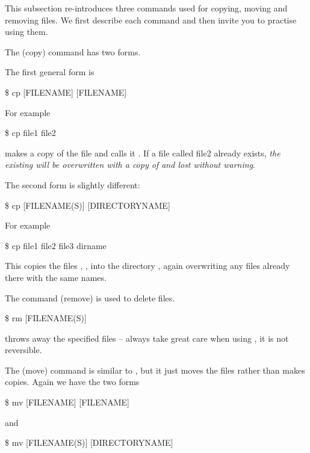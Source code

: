 This subsection re-introduces three commands used for copying, moving and
removing files. We first describe each command and then invite you to
practise using them.

\noindent The  (copy) command has two forms.


The first general form is
\begin{ttoutenv}
\$  cp [FILENAME] [FILENAME] \return
\end{ttoutenv}

For example

\begin{ttoutenv}
\$  cp file1 file2 \return
\end{ttoutenv}
%
makes a copy of the file  and calls it .  If
a file called file2 already exists, \emph{the existing  will be  overwritten
with a copy of  and lost without warning}.

The second form is slightly different:
\begin{ttoutenv}
\$  cp [FILENAME(S)] [DIRECTORYNAME]
\end{ttoutenv}
%
For example

\begin{ttoutenv}
\$  cp file1 file2 file3 dirname \return
\end{ttoutenv}

This copies the files , ,  into
the directory , again overwriting any files already
there with the same names.

The command  (remove) is used to delete files.
\begin{ttoutenv}
\$  rm [FILENAME(S)]
\end{ttoutenv}
%
throws away the specified files -- always take great care when using
, it is not reversible.

The  (move) command is similar to , but it just moves
the files rather than makes copies. Again we have the two forms
\begin{ttoutenv}
\$  mv [FILENAME] [FILENAME] \return
\end{ttoutenv}
and
\begin{ttoutenv}
\$  mv [FILENAME(S)] [DIRECTORYNAME] \return
\end{ttoutenv}

